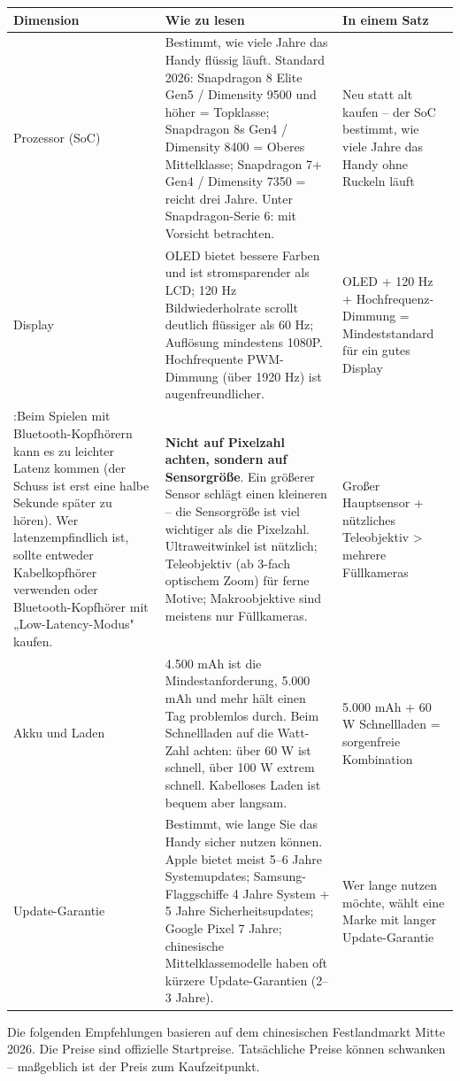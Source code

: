 \begin{center}
\begin{tabularx}{\linewidth}{|X|X|X|}
\hline
\textbf{Dimension} & \textbf{Wie zu lesen} & \textbf{In einem Satz} \tabularnewline
\hline
Prozessor (SoC) & Bestimmt, wie viele Jahre das Handy flüssig läuft. Standard 2026: Snapdragon 8 Elite Gen5 / Dimensity 9500 und höher = Topklasse; Snapdragon 8s Gen4 / Dimensity 8400 = Oberes Mittelklasse; Snapdragon 7+ Gen4 / Dimensity 7350 = reicht drei Jahre. Unter Snapdragon-Serie 6: mit Vorsicht betrachten. & Neu statt alt kaufen – der SoC bestimmt, wie viele Jahre das Handy ohne Ruckeln läuft \tabularnewline
Display & OLED bietet bessere Farben und ist stromsparender als LCD; 120 Hz Bildwiederholrate scrollt deutlich flüssiger als 60 Hz; Auflösung mindestens 1080P. Hochfrequente PWM-Dimmung (über 1920 Hz) ist augenfreundlicher. & OLED + 120 Hz + Hochfrequenz-Dimmung = Mindeststandard für ein gutes Display \tabularnewline
:Beim Spielen mit Bluetooth-Kopfhörern kann es zu leichter Latenz kommen (der Schuss ist erst eine halbe Sekunde später zu hören). Wer latenzempfindlich ist, sollte entweder Kabelkopfhörer verwenden oder Bluetooth-Kopfhörer mit „Low-Latency-Modus" kaufen. & \textbf{Nicht auf Pixelzahl achten, sondern auf Sensorgröße}. Ein größerer Sensor schlägt einen kleineren – die Sensorgröße ist viel wichtiger als die Pixelzahl. Ultraweitwinkel ist nützlich; Teleobjektiv (ab 3-fach optischem Zoom) für ferne Motive; Makroobjektive sind meistens nur Füllkameras. & Großer Hauptsensor + nützliches Teleobjektiv > mehrere Füllkameras \tabularnewline
Akku und Laden & 4.500 mAh ist die Mindestanforderung, 5.000 mAh und mehr hält einen Tag problemlos durch. Beim Schnellladen auf die Watt-Zahl achten: über 60 W ist schnell, über 100 W extrem schnell. Kabelloses Laden ist bequem aber langsam. & 5.000 mAh + 60 W Schnellladen = sorgenfreie Kombination \tabularnewline
Update-Garantie & Bestimmt, wie lange Sie das Handy sicher nutzen können. Apple bietet meist 5–6 Jahre Systemupdates; Samsung-Flaggschiffe 4 Jahre System + 5 Jahre Sicherheitsupdates; Google Pixel 7 Jahre; chinesische Mittelklassemodelle haben oft kürzere Update-Garantien (2–3 Jahre). & Wer lange nutzen möchte, wählt eine Marke mit langer Update-Garantie \tabularnewline
\hline
\end{tabularx}
\end{center}


Die folgenden Empfehlungen basieren auf dem chinesischen Festlandmarkt Mitte 2026. Die Preise sind offizielle Startpreise. Tatsächliche Preise können schwanken – maßgeblich ist der Preis zum Kaufzeitpunkt.

